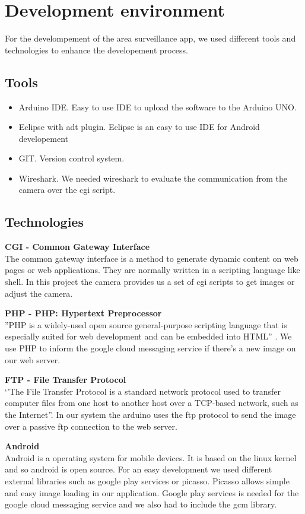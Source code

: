 \section[Development environment - Team]{Development environment}
For the develompement of the area surveillance app, we used different tools and technologies to enhance the developement process.

\subsection{Tools}
\begin{itemize}
\item Arduino IDE. Easy to use IDE to upload the software to the Arduino UNO.
\item Eclipse with adt plugin. Eclipse is an easy to use IDE for Android developement
\item GIT. Version control system.
\item Wireshark. We needed wireshark to evaluate the communication from the camera over the cgi script.
\end{itemize}

\subsection{Technologies}

\textbf{CGI - Common Gateway Interface} \\
The common gateway interface is a method to generate dynamic content on web pages or web applications. They are normally written in a scripting language like shell. In this project the camera provides us a set of cgi scripts to get images or adjust the camera.

\textbf{PHP - PHP: Hypertext Preprocessor} \\
''PHP is a widely-used open source general-purpose scripting language that is especially suited for web development and can be embedded into HTML'' \cite{php}. We use PHP to inform the google cloud messaging service if there's a new image on our web server.


\textbf{FTP - File Transfer Protocol} \\
‘’The File Transfer Protocol is a standard network protocol used to transfer computer files from one host to another host over a TCP-based network, such as the Internet''. In our system the arduino uses the ftp protocol to send the image over a passive ftp connection to the web server.

\textbf{Android} \\
Android is a operating system for mobile devices. It is based on the linux kernel and so android is open source. For an easy development we used different external libraries such as google play services or picasso. Picasso allows simple and easy image loading in our application. Google play services is needed for the google cloud messaging service and we also had to include the gcm library.


